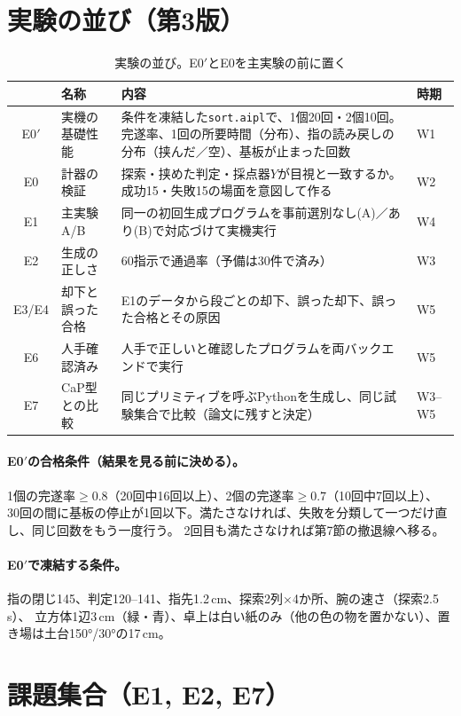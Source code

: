 \documentclass[11pt,a4paper]{article}
\begin{document}
\section{実験の並び（第3版）}

\begin{table}[h]\centering\small
\caption{実験の並び。E0$'$とE0を主実験の前に置く}
\begin{tabularx}{\textwidth}{@{}clYl@{}}
\toprule
& 名称 & 内容 & 時期 \\
\midrule
E0$'$ & 実機の基礎性能 & 条件を凍結した\texttt{sort.aipl}で、1個20回・2個10回。完遂率、1回の所要時間（分布）、指の読み戻しの分布（挟んだ／空）、基板が止まった回数 & W1 \\
E0 & 計器の検証 & 探索・挟めた判定・採点器$Y$が目視と一致するか。成功15・失敗15の場面を意図して作る & W2 \\
E1 & 主実験A/B & 同一の初回生成プログラムを事前選別なし(A)／あり(B)で対応づけて実機実行 & W4 \\
E2 & 生成の正しさ & 60指示で通過率（予備は30件で済み） & W3 \\
E3/E4 & 却下と誤った合格 & E1のデータから段ごとの却下、誤った却下、誤った合格とその原因 & W5 \\
E6 & 人手確認済み & 人手で正しいと確認したプログラムを両バックエンドで実行 & W5 \\
E7 & CaP型との比較 & 同じプリミティブを呼ぶPythonを生成し、同じ試験集合で比較（論文に残すと決定） & W3--W5 \\
\bottomrule
\end{tabularx}
\end{table}

\paragraph{E0$'$の合格条件（結果を見る前に決める）。}1個の完遂率$\ge0.8$（20回中16回以上）、2個の完遂率$\ge0.7$（10回中7回以上）、
30回の間に基板の停止が1回以下。満たさなければ、失敗を分類して一つだけ直し、同じ回数をもう一度行う。
2回目も満たさなければ第7節の撤退線へ移る。

\paragraph{E0$'$で凍結する条件。}指の閉じ145、判定120--141、指先1.2\,cm、探索2列×4か所、腕の速さ（探索2.5\,s）、
立方体1辺3\,cm（緑・青）、卓上は白い紙のみ（他の色の物を置かない）、置き場は土台150°/30°の17\,cm。

\section{課題集合（E1, E2, E7）}
\end{document}
